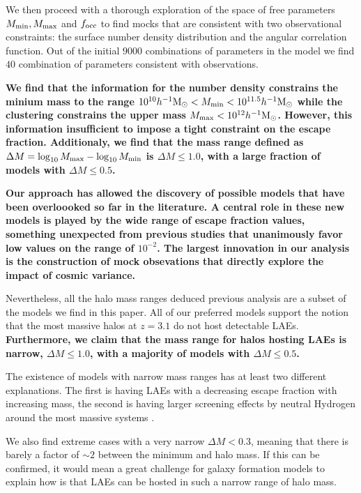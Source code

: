 \documentclass[usenatbib]{mn2e}
\newcommand{\ly}{{\ifmmode{{\rm Ly}\alpha}\else{Ly$\alpha$~}\fi}}
\newcommand{\hMsun}{{\ifmmode{h^{-1}{\rm
        {M_{\odot}}}}\else{$h^{-1}{\rm{M_{\odot}}}$}\fi}}
\begin{document}
We then proceed with a
thorough exploration of the space of free parameters $M_{\rm min},
M_{\rm max}$ and $f_{\rm occ}$ to find mocks that are consistent with
two observational constraints: the surface number density distribution
and the angular correlation function. Out of the initial $9000$ 
combinations of parameters in the model we find $40$ combination of parameters
consistent with observations.

{\bf We find that the information for the number density constrains
  the minium mass to the range
  $10^{10}\hMsun < M_{\rm min} < 10^{11.5}\hMsun$ while the clustering
  constrains the upper mass $M_{\rm    max} < 10^{12}\hMsun$. However,
  this information insufficient to impose a tight constraint  on the escape
  fraction. Additionaly, we find that the mass range defined as
$\Delta M=\log_{10}M_{\rm max} - \log_{10}M_{\rm min}$ is $\Delta
M\leq 1.0$, with a large fraction of models with $\Delta M\leq 0.5$.} 

{\bf Our approach has allowed the discovery of possible models that have
been overloooked so far in the literature. A central role in these new
models is played by the wide range of escape fraction values,
something unexpected from previous studies \citep[i.e.][]{Gawiser2007,Ouchi2010}  that unanimously favor low values on the range of $10^{-2}$. The largest
innovation in our analysis is the construction of mock obsevations
that directly explore the impact of cosmic variance.}

Nevertheless, all the halo mass ranges deduced previous analysis are a
subset of the models we find in this paper.  All of our
preferred models support the notion that the most massive halos at
$z=3.1$ do not host detectable LAEs. {\bf Furthermore, we claim that the
mass range for halos hosting LAEs is narrow, $\Delta M\leq 1.0$, with
a majority of models with $\Delta M\leq 0.5$.}

The existence of models with narrow mass ranges has at least two
different explanations. The first is having LAEs with a decreasing \ly
escape fraction with increasing mass, the second is having larger
screening effects by neutral Hydrogen around the most massive systems
\citep{Laursen2009,ForeroRomero2011}.     

We also find extreme cases with a very narrow $\Delta M<0.3$, meaning that
there is barely a factor of $\sim 2$ between the minimum and halo
mass. If this can be confirmed, it would mean a great
challenge for galaxy formation models to explain how is that LAEs can
be hosted in such a narrow range of halo mass.  
\end{document}
